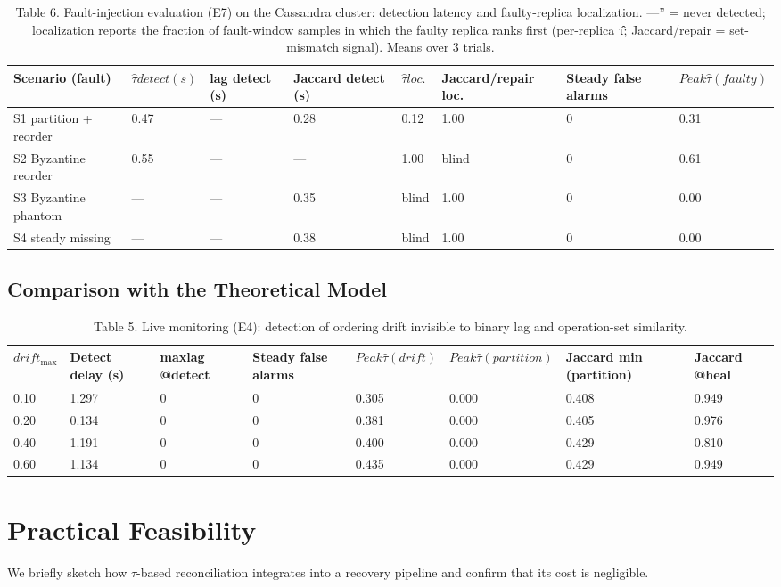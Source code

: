 \documentclass[10pt,twocolumn]{article}
\begin{document}
\begin{table}[t]
\centering
\caption{Table 6. Fault-injection evaluation (E7) on the Cassandra cluster: detection latency and faulty-replica localization. —” = never detected; localization reports the fraction of fault-window samples in which the faulty replica ranks first (per-replica τ̂; Jaccard/repair = set-mismatch signal). Means over 3 trials.}
\begin{tabular}{llllllll}
\hline
Scenario (fault) & $\hat{\tau} detect (s)$ & lag detect (s) & Jaccard detect (s) & $\hat{\tau} loc.$ & Jaccard/repair loc. & Steady false alarms & $Peak \hat{\tau} (faulty)$ \\
\hline
S1 partition + reorder & 0.47 & — & 0.28 & 0.12 & 1.00 & 0 & 0.31 \\
S2 Byzantine reorder & 0.55 & — & — & 1.00 & blind & 0 & 0.61 \\
S3 Byzantine phantom & — & — & 0.35 & blind & 1.00 & 0 & 0.00 \\
S4 steady missing & — & — & 0.38 & blind & 1.00 & 0 & 0.00 \\
\hline
\end{tabular}
\end{table}

\subsection{Comparison with the Theoretical Model}
\begin{table}[t]
\centering
\caption{Table 5. Live monitoring (E4): detection of ordering drift invisible to binary lag and operation-set similarity.}
\begin{tabular}{llllllll}
\hline
$drift_{\mathrm{max}}$ & Detect delay (s) & maxlag @detect & Steady false alarms & $Peak \hat{\tau} (drift)$ & $Peak \hat{\tau} (partition)$ & Jaccard min (partition) & Jaccard @heal \\
\hline
0.10 & 1.297 & 0 & 0 & 0.305 & 0.000 & 0.408 & 0.949 \\
0.20 & 0.134 & 0 & 0 & 0.381 & 0.000 & 0.405 & 0.976 \\
0.40 & 1.191 & 0 & 0 & 0.400 & 0.000 & 0.429 & 0.810 \\
0.60 & 1.134 & 0 & 0 & 0.435 & 0.000 & 0.429 & 0.949 \\
\hline
\end{tabular}
\end{table}

\section{Practical Feasibility}
We briefly sketch how $\tau$-based reconciliation integrates into a recovery pipeline and confirm that its cost is negligible.
\end{document}
